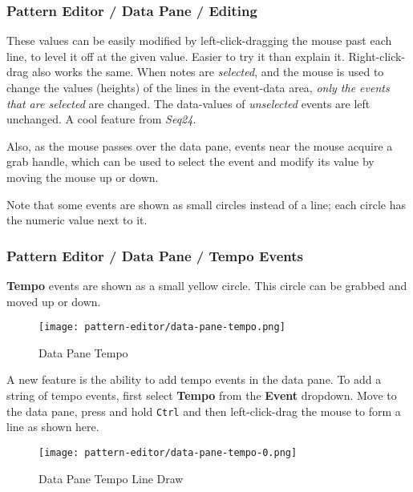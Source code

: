 \subsubsection{Pattern Editor / Data Pane / Editing}
\label{subsubsec:pattern_editor_data_view_editing}

   These values can be easily modified by
   left-click-dragging the
   mouse past each line, to level it off at the given value.
   Easier to try it than explain it.
   Right-click-drag also works the same.
   When notes are \textsl{selected}, and the
   mouse is used to change the values (heights) of the lines in the event-data
   area, \textsl{only the events that are selected} are changed.
   The data-values of \textsl{unselected} events are left unchanged.
   A cool feature from \textsl{Seq24}.

   Also, as the mouse passes over the data pane, events near the mouse
   acquire a grab handle, which can be used to select the event
   and modify its value by moving the mouse up or down.

   Note that some events are shown as small circles instead of a line; each
   circle has the numeric value next to it.

\subsubsection{Pattern Editor / Data Pane / Tempo Events}
\label{subsubsec:pattern_editor_data_view_tempo_events}

   \textbf{Tempo}
   events are shown as a small yellow circle.
   This circle can be grabbed and moved up or down.

\begin{figure}[H]
   \centering 
   \texttt{[image: pattern-editor/data-pane-tempo.png]}
   \caption{Data Pane Tempo}
   \label{fig:pattern_editor_data_pane_tempo}
\end{figure}

   A new feature is the ability to
   add tempo events in the data pane.
   To add a string of tempo events, first select \textbf{Tempo}
   from the \textbf{Event} dropdown.
   Move to the data pane, press and hold \texttt{Ctrl}
   and then left-click-drag the mouse to form a line
   as shown here.

\begin{figure}[H]
   \centering 
   \texttt{[image: pattern-editor/data-pane-tempo-0.png]}
   \caption{Data Pane Tempo Line Draw}
   \label{fig:pattern_editor_data_pane_tempo_line_draw}
\end{figure}


